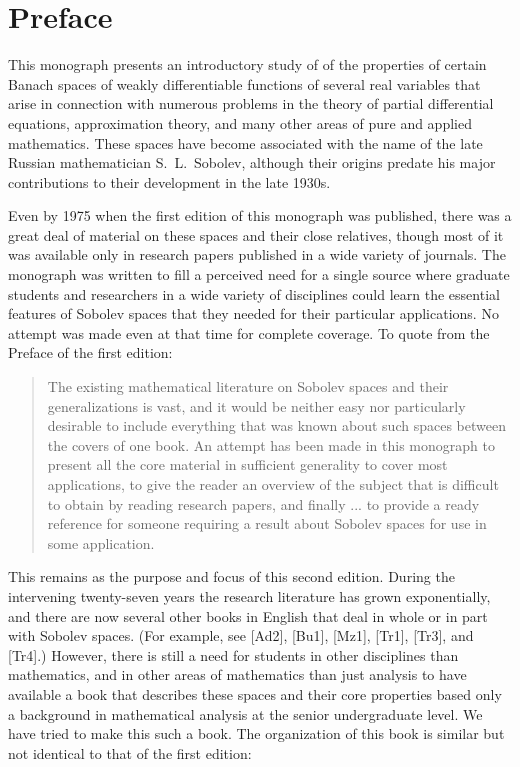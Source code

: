 \chapter*{Preface}

This monograph presents an introductory study of of the properties of certain Banach spaces of 
weakly differentiable functions of several real variables that arise in connection with numerous 
problems in the theory of partial differential equations, approximation theory, and many other 
areas of pure and applied mathematics. These spaces have become associated with the name of the 
late Russian mathematician S.~L.~Sobolev, although their origins predate his major contributions 
to their development in the late 1930s.

Even by 1975 when the first edition of this monograph was published, there was a great deal of 
material on these spaces and their close relatives, though most of it was available only in 
research papers published in a wide variety of journals. The monograph was written to fill a 
perceived need for a single source where graduate students and researchers in a wide variety of 
disciplines could learn the essential features of Sobolev spaces that they needed for their 
particular applications. No attempt was made even at that time for complete coverage.
To quote from the Preface of the first edition:

\begin{quotation}
  The existing mathematical literature on Sobolev spaces and their generalizations is vast,
  and it would be neither easy nor particularly desirable to include everything that was known 
  about such spaces between the covers of one book. An attempt has been made in this monograph to 
  present all the core material in sufficient generality to cover most applications, to give the 
  reader an overview of the subject that is difficult to obtain by reading research papers, and 
  finally ... to provide a ready reference for someone requiring a result about Sobolev spaces for 
  use in some application.
\end{quotation}

This remains as the purpose and focus of this second edition. During the intervening twenty-seven 
years the research literature has grown exponentially, and there are now several other books in 
English that deal in whole or in part with Sobolev spaces. (For example, see [Ad2], [Bu1], [Mz1], 
[Tr1], [Tr3], and [Tr4].) However, there is still a need for students in other disciplines than 
mathematics, and in other areas of mathematics than just analysis to have available a book that 
describes these spaces and their core properties based only a background in mathematical analysis 
at the senior undergraduate level. We have tried to make this such a book. The organization of 
this book is similar but not identical to that of the first edition:

